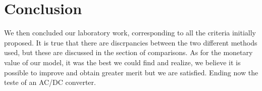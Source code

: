 \section{Conclusion}
\label{sec:conclusion} 

We then concluded our laboratory work, corresponding to all the criteria initially proposed. It is true that there are discrpancies between the two different methods used, but these are discussed in the section of comparisons. As for the monetary value of our model, it was the best we could find and realize, we believe it is possible to improve and obtain greater merit but we are satisfied. Ending now the teste of an AC/DC converter.
